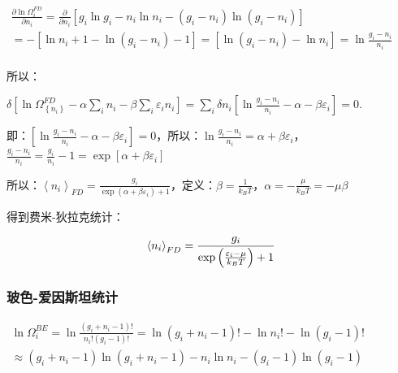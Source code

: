 $\begin{array}{l}
 \frac{{\partial \ln \Omega _i^{FD} }}{{\partial n_i }} = \frac{\partial }{{\partial n_i }}\left[ {g_i \ln g_i  - n_i \ln n_i  - \left( {g_i  - n_i } \right)\ln \left( {g_i  - n_i } \right)} \right] \\
  =  - \left[ {\ln n_i  + 1 - \ln \left( {g_i  - n_i } \right) - 1} \right] = \left[ {\ln \left( {g_i  - n_i } \right) - \ln n_i } \right] = \ln \frac{{g_i  - n_i }}{{n_i }} \\
 \end{array}$


所以：

$ \delta \left[ {\ln \Omega _{\left\{ {n_i } \right\}}^{FD}  - \alpha \sum\limits_i {n_i }  - \beta \sum\limits_i {\varepsilon _i n_i } } \right]  =  \sum\limits_i {\delta n_i \left[ {\ln \frac{{g_i  - n_i }}{{n_i }} - \alpha  - \beta \varepsilon _i } \right]}  = 0$.

即：$\left[ {\ln \frac{{g_i  - n_i }}{{n_i }} - \alpha  - \beta \varepsilon _i } \right] = 0$，所以：$\ln \frac{{g_i  - n_i }}{{n_i }} = \alpha  + \beta \varepsilon _i $，$\frac{{g_i  - n_i }}{{n_i }} = \frac{{g_i }}{{n_i }} - 1 = \exp \left[ {\alpha  + \beta \varepsilon _i } \right]$


所以：$\left\langle {n_i } \right\rangle _{FD}  = \frac{{g_i }}{{\exp \left( {\alpha  + \beta \varepsilon _i } \right) + 1}}$，定义：$\beta  = \frac{1}{{k_B T}}$，$\alpha  =  - \frac{\mu }{{k_B T}} =  - \mu \beta $

得到费米-狄拉克统计：


\begin{equation}\label{33-7}
\left\langle {n_i } \right\rangle _{FD}  = \frac{{g_i }}{{\exp \left( {{\textstyle{{\varepsilon _i  - \mu } \over {k_B T}}}} \right) + 1}}
\end{equation}


\subsubsection{玻色-爱因斯坦统计}


$\begin{array}{l}
 \ln \Omega _i^{BE}  = \ln \frac{{\left( {g_i  + n_i  - 1} \right)!}}{{n_i !\left( {g_i  - 1} \right)!}} = \ln \left( {g_i  + n_i  - 1} \right)! - \ln n_i ! - \ln \left( {g_i  - 1} \right)! \\
  \approx \left( {g_i  + n_i  - 1} \right)\ln \left( {g_i  + n_i  - 1} \right) - n_i \ln n_i  - \left( {g_i  - 1} \right)\ln \left( {g_i  - 1} \right) \\
 \end{array}$


